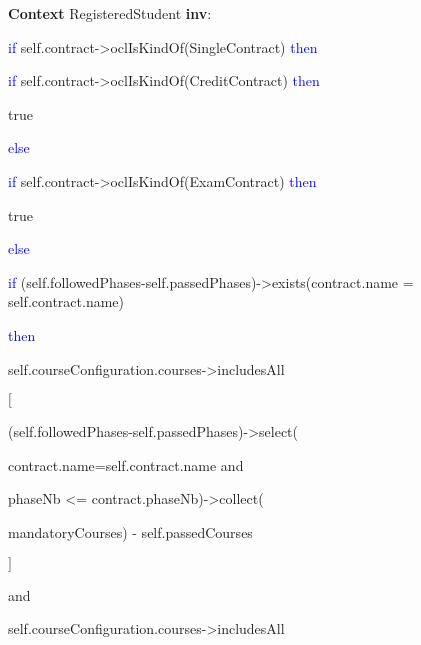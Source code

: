 \begin{enumerate}
	\npar \textbf{Context} RegisteredStudent \textbf{inv}:
	\par \hspace*{5 mm} \textcolor{Blue}{if}
	self.contract->oclIsKindOf(SingleContract) \textcolor{Blue}{then}
	\par \hspace*{10 mm} \textcolor{Blue}{if}
	self.contract->oclIsKindOf(CreditContract) \textcolor{Blue}{then} 
	\par \hspace*{15 mm} true
	\par \hspace*{10 mm} \textcolor{Blue}{else}
	\par \hspace*{15 mm} \textcolor{Blue}{if}
	self.contract->oclIsKindOf(ExamContract) \textcolor{Blue}{then} 
	\par \hspace*{20 mm} true
	\par \hspace*{15 mm} \textcolor{Blue}{else}
	\par \hspace*{20 mm} \textcolor{Blue}{if}
	(self.followedPhases-self.passedPhases)->exists(contract.name
	= self.contract.name)
	\par \hspace*{20 mm} \textcolor{Blue}{then}
	 \par \hspace*{25 mm} self.courseConfiguration.courses->includesAll
	 \par \hspace*{25 mm} $[$
	 \par \hspace*{27 mm} (self.followedPhases-self.passedPhases)->select(
	 \par \hspace*{27 mm} contract.name=self.contract.name and 
	 \par \hspace*{27 mm} phaseNb <= contract.phaseNb)->collect(
	 \par \hspace*{27 mm}  mandatoryCourses) - self.passedCourses
	 \par \hspace*{25 mm} $]$
	 \par \hspace*{25 mm} and
	 \par \hspace*{25 mm} self.courseConfiguration.courses->includesAll

\end{enumerate}
